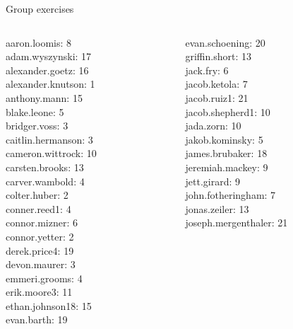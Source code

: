 \documentclass[10pt]{beamer}
\begin{document}
\begin{frame}[standout]
Group exercises
\end{frame}

\begin{frame}
\footnotesize 
\vfill 
\begin{columns}
\begin{column}{0.33\textwidth}
aaron.loomis: 8 \\ 
adam.wyszynski: 17 \\ 
alexander.goetz: 16 \\ 
alexander.knutson: 1 \\ 
anthony.mann: 15 \\ 
blake.leone: 5 \\ 
bridger.voss: 3 \\ 
caitlin.hermanson: 3 \\ 
cameron.wittrock: 10 \\ 
carsten.brooks: 13 \\ 
carver.wambold: 4 \\ 
colter.huber: 2 \\ 
conner.reed1: 4 \\ 
connor.mizner: 6 \\ 
connor.yetter: 2 \\ 
derek.price4: 19 \\ 
devon.maurer: 3 \\ 
emmeri.grooms: 4 \\ 
erik.moore3: 11 \\ 
ethan.johnson18: 15 \\ 
evan.barth: 19 \\\end{column}
\begin{column}{0.33\textwidth}
evan.schoening: 20 \\ 
griffin.short: 13 \\ 
jack.fry: 6 \\ 
jacob.ketola: 7 \\ 
jacob.ruiz1: 21 \\ 
jacob.shepherd1: 10 \\ 
jada.zorn: 10 \\ 
jakob.kominsky: 5 \\ 
james.brubaker: 18 \\ 
jeremiah.mackey: 9 \\ 
jett.girard: 9 \\ 
john.fotheringham: 7 \\ 
jonas.zeiler: 13 \\ 
joseph.mergenthaler: 21 \\ 

\end{column}
\end{columns}
\end{frame}
\end{document}
